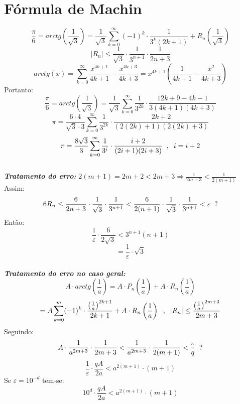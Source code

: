 \documentclass[12pt]{article}
\begin{document}
\section{Fórmula de Machin}
\[\frac{\pi}{6}=arctg\left(\frac{1}{\sqrt3}\right)=\frac{1}{\sqrt3}\sum_{k=0}^{\infty}(-1)^k\cdot\frac{1}{3^k(2k+1)}+R_n\left(\frac{1}{\sqrt3}\right)\]
\[\left|R_n\right|\leq\frac{1}{\sqrt3}\cdot\frac{1}{3^{n+1}}\cdot\frac{1}{2n+3}\]
\[arctg(x)=\sum_{k=0}^{\infty}\frac{x^{4k+1}}{4k+1}-\frac{x^{4k+3}}{4k+3}=x^{4k+1}\left(\frac{1}{4k+1}-\frac{x^2}{4k+3}\right)\]
Portanto:
\[\frac{\pi}{6}=arctg\left(\frac{1}{\sqrt3}\right)=\frac{1}{\sqrt3}\sum_{k=0}^{\infty}\frac{1}{3^{2k}}\cdot\frac{12k+9-4k-1}{3(4k+1)(4k+3)}\]
\[\pi=\frac{6\cdot4}{\sqrt3\cdot3}\sum_{k=0}^{\infty}\frac{1}{3^{2k}}\cdot\frac{2k+2}{(2(2k)+1)(2(2k)+3)}\]
\[\pi=\frac{8\sqrt3}{3}\sum_{k=0}^{\infty}\frac{1}{3^i}\cdot\frac{i+2}{(2i+1)(2i+3)}\hspace{0.2cm},\hspace{0.2cm}i=i+2\]\\
\vspace{0.5cm}\textbf{\textit{Tratamento do erro:}} \(2(m+1)=2m+2<2m+3\Rightarrow \frac{1}{2m+3}<\frac{1}{2(m+1)}\)
Assim:
\[6R_n\leq\frac{6}{2n+3}\cdot\frac{1}{\sqrt3}\cdot\frac{1}{3^{n+1}}<\frac{6}{2(n+1)}\cdot\frac{1}{\sqrt3}\cdot\frac{1}{3^{n+1}}<\varepsilon\hspace{0.2cm}?\]
Então:
\[\frac{1}{\varepsilon}\cdot\frac{6}{2\sqrt3}<3^{n+1}(n+1)\]
\[=\frac{1}{\varepsilon}\cdot\sqrt3\]\\
\vspace{0.5cm}
\textbf{\textit{Tratamento do erro no caso geral:}}
\[A\cdot arctg\left(\frac{1}{a}\right)=A\cdot P_n\left(\frac{1}{a}\right)+A\cdot R_n\left(\frac{1}{a}\right)\]
\[=A\sum_{k=0}^{m}(-1)^k\cdot\frac{\left(\frac{1}{a}\right)^{2k+1}}{2k+1}+A\cdot R_n\left(\frac{1}{a}\right)\hspace{0.2cm},\hspace{0.2cm}\left|R_n\right|\leq\frac{\left(\frac{1}{a}\right)^{2m+3}}{2m+3}\]
Seguindo:
\[A\cdot\frac{1}{a^{2m+3}}\cdot\frac{1}{2m+3}<\frac{1}{a^{2m+3}}\cdot\frac{1}{2(m+1)}<\frac{\varepsilon}{q}\hspace{0.2cm}?\]
\[\frac{1}{\varepsilon}\cdot\frac{qA}{2a}<a^{2(m+1)}\cdot(m+1)\]
Se \(\varepsilon =10^{-d}\) tem-se:
\[10^d\cdot\frac{qA}{2a}<a^{2(m+1)}\cdot(m+1)\]
\end{document}
